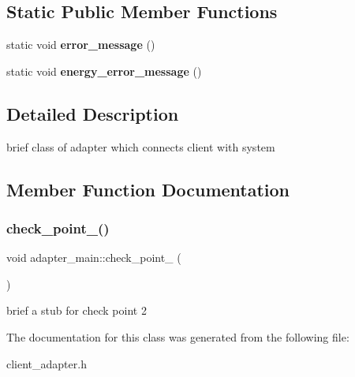 \subsection*{Static Public Member Functions}
\begin{DoxyCompactItemize}
\item 
\mbox{\label{classadapter__main_a5b0ad3103e82411f5c41bed2a2a841cb}} 
static void {\bfseries error\+\_\+message} ()
\item 
\mbox{\label{classadapter__main_abf91aee4ba6024b7bfd81c16b61b655e}} 
static void {\bfseries energy\+\_\+error\+\_\+message} ()
\end{DoxyCompactItemize}


\subsection{Detailed Description}
brief class of adapter which connects client with system 

\subsection{Member Function Documentation}
\mbox{\label{classadapter__main_a107eff404526bd331801946b03a951f0}} 
\subsubsection{\texorpdfstring{check\+\_\+point\+\_()}{check\_point\_2()}}
{\footnotesize\ttfamily void adapter\+\_\+main\+::check\+\_\+point\+\_ (\begin{DoxyParamCaption}{ }\end{DoxyParamCaption})\hspace{0.3cm}{\ttfamily [inline]}}

brief a stub for check point 2 

The documentation for this class was generated from the following file\+:\begin{DoxyCompactItemize}
\item 
client\+\_\+adapter.\+h\end{DoxyCompactItemize}
